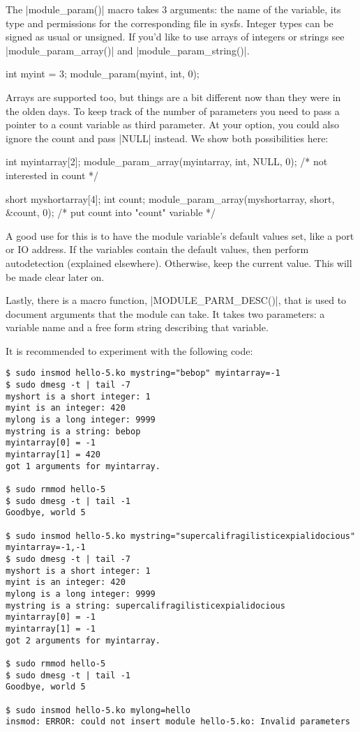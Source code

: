\documentclass[10pt, oneside]{book}
\begin{document}
The \cpp|module_param()| macro takes 3 arguments: the name of the variable, its type and permissions for the corresponding file in sysfs.
Integer types can be signed as usual or unsigned. If you'd like to use arrays of integers or strings see \cpp|module_param_array()| and \cpp|module_param_string()|.

\begin{code}
int myint = 3;
module_param(myint, int, 0);
\end{code}

Arrays are supported too, but things are a bit different now than they were in the olden days.
To keep track of the number of parameters you need to pass a pointer to a count variable as third parameter. 
At your option, you could also ignore the count and pass \cpp|NULL| instead. We show both possibilities here:

\begin{code}
int myintarray[2];
module_param_array(myintarray, int, NULL, 0); /* not interested in count */

short myshortarray[4];
int count;
module_param_array(myshortarray, short, &count, 0); /* put count into "count" variable */
\end{code}

A good use for this is to have the module variable's default values set, like a port or IO address.
If the variables contain the default values, then perform autodetection (explained elsewhere). Otherwise, keep the current value.
This will be made clear later on.

Lastly, there is a macro function, \cpp|MODULE_PARM_DESC()|, that is used to document arguments that the module can take.
It takes two parameters: a variable name and a free form string describing that variable.


It is recommended to experiment with the following code:
\begin{verbatim}
$ sudo insmod hello-5.ko mystring="bebop" myintarray=-1
$ sudo dmesg -t | tail -7
myshort is a short integer: 1
myint is an integer: 420
mylong is a long integer: 9999
mystring is a string: bebop
myintarray[0] = -1
myintarray[1] = 420
got 1 arguments for myintarray.

$ sudo rmmod hello-5
$ sudo dmesg -t | tail -1
Goodbye, world 5

$ sudo insmod hello-5.ko mystring="supercalifragilisticexpialidocious" myintarray=-1,-1
$ sudo dmesg -t | tail -7
myshort is a short integer: 1
myint is an integer: 420
mylong is a long integer: 9999
mystring is a string: supercalifragilisticexpialidocious
myintarray[0] = -1
myintarray[1] = -1
got 2 arguments for myintarray.

$ sudo rmmod hello-5
$ sudo dmesg -t | tail -1
Goodbye, world 5

$ sudo insmod hello-5.ko mylong=hello
insmod: ERROR: could not insert module hello-5.ko: Invalid parameters
\end{verbatim}
\end{document}
